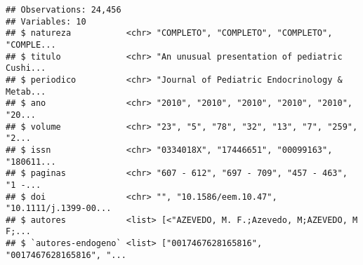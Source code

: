 \documentclass[]{article}
\newenvironment{Shaded}{\begin{snugshade}}{\end{snugshade}}
\newcommand{\KeywordTok}[1]{\textcolor[rgb]{0.13,0.29,0.53}{\textbf{#1}}}
\newcommand{\DataTypeTok}[1]{\textcolor[rgb]{0.13,0.29,0.53}{#1}}
\newcommand{\CharTok}[1]{\textcolor[rgb]{0.31,0.60,0.02}{#1}}
\newcommand{\StringTok}[1]{\textcolor[rgb]{0.31,0.60,0.02}{#1}}
\newcommand{\CommentTok}[1]{\textcolor[rgb]{0.56,0.35,0.01}{\textit{#1}}}
\newcommand{\OperatorTok}[1]{\textcolor[rgb]{0.81,0.36,0.00}{\textbf{#1}}}
\newcommand{\NormalTok}[1]{#1}
\begin{document}
\begin{verbatim}
## Observations: 24,456
## Variables: 10
## $ natureza           <chr> "COMPLETO", "COMPLETO", "COMPLETO", "COMPLE...
## $ titulo             <chr> "An unusual presentation of pediatric Cushi...
## $ periodico          <chr> "Journal of Pediatric Endocrinology & Metab...
## $ ano                <chr> "2010", "2010", "2010", "2010", "2010", "20...
## $ volume             <chr> "23", "5", "78", "32", "13", "7", "259", "2...
## $ issn               <chr> "0334018X", "17446651", "00099163", "180611...
## $ paginas            <chr> "607 - 612", "697 - 709", "457 - 463", "1 -...
## $ doi                <chr> "", "10.1586/eem.10.47", "10.1111/j.1399-00...
## $ autores            <list> [<"AZEVEDO, M. F.;Azevedo, M;AZEVEDO, M F;...
## $ `autores-endogeno` <list> ["0017467628165816", "0017467628165816", "...
\end{verbatim}

\begin{Shaded}
\end{Shaded}
\end{document}
